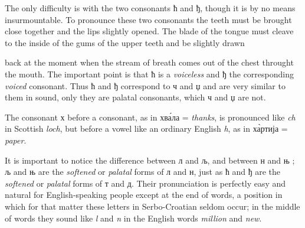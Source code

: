         \begin{samepage} The only difficulty is with the two consonants ћ and
        ђ, though it is by no means insurmountable. To pronounce
        these two consonants the teeth must be brought close together and the
        lips slightly opened. The blade of the tongue
        must cleave to the inside of the gums of the upper teeth and be
        slightly drawn \end{samepage}  back at the moment when the stream of breath comes out
        of the chest throught the mouth. The important point is that
        ћ is a \textit{voiceless} and ђ the corresponding \textit{voiced}
        consonant. Thus ћ and ђ correspond to ч and џ and are very similar to
        them in sound, only they are palatal consonants, which ч and џ are not.

        The consonant {х} before a consonant, as in
        хв\'{а}ла = \textit{thanks}, is pronounced like \textit{ch}
        in Scottish \textit{loch}, but before a vowel like an ordinary English
        \textit{h}, as in х\`{а}ртија = \textit{paper}.

        It is important to notice the difference between л and љ, and between н
        and њ ; љ and њ are the \textit{softened} or \textit{palatal} forms of
        л and н, just as ћ and ђ are the \textit{softened} or \textit{palatal}
        forms of т and д. Their pronunciation is perfectly easy and natural for
        English-speaking people except at the end of words, a position in which
        for that matter these letters in Serbo-Croatian seldom occur; in the
        middle of words they sound like \textit{l} and \emph{n} in the English
        words \emph{million} and \emph{new}. 
